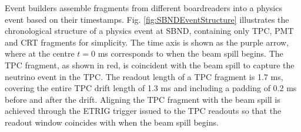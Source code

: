


Event builders assemble fragments from different boardreaders into a physics event based on their timestamps.
Fig. \ref{fig:SBNDEventStructure} illustrates the chronological structure of a physics event at SBND, containing only TPC, PMT and CRT fragments for simplicity.
The time axis is shown as the purple arrow, where at the centre $t = 0$ ms corresponds to when the beam spill begins.
The TPC fragment, as shown in red, is coincident with the beam spill to capture the neutrino event in the TPC. 
The readout length of a TPC fragment is 1.7 ms, covering the entire TPC drift length of 1.3 ms and including a padding of 0.2 ms before and after the drift. 
Aligning the TPC fragment with the beam spill is achieved through the ETRIG trigger issued to the TPC readouts so that the readout window coincides with when the beam spill begins.

